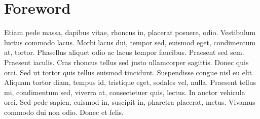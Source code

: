 \chapter{Foreword}

Etiam pede massa, dapibus vitae, rhoncus in, placerat posuere, odio. Vestibulum luctus commodo lacus. Morbi lacus dui, tempor sed, euismod eget, condimentum at, tortor. Phasellus aliquet odio ac lacus tempor faucibus. Praesent sed sem. Praesent iaculis. Cras rhoncus tellus sed justo ullamcorper sagittis. Donec quis orci. Sed ut tortor quis tellus euismod tincidunt. Suspendisse congue nisl eu elit. Aliquam tortor diam, tempus id, tristique eget, sodales vel, nulla. Praesent tellus mi, condimentum sed, viverra at, consectetuer quis, lectus. In auctor vehicula orci. Sed pede sapien, euismod in, suscipit in, pharetra placerat, metus. Vivamus commodo dui non odio. Donec et felis.